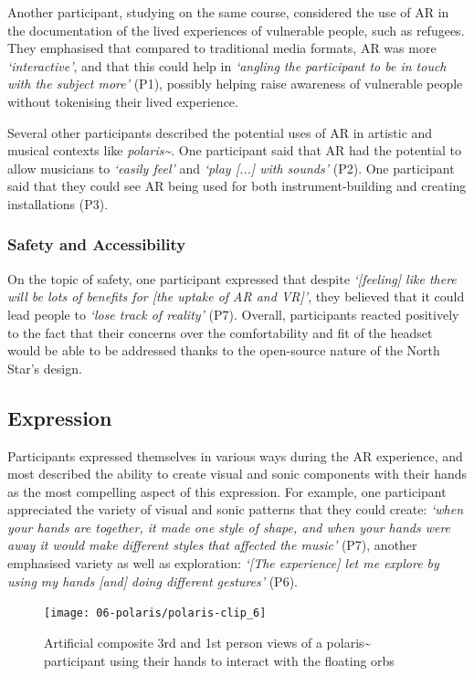 Another participant, studying on the same course, considered the use of AR in the documentation of the lived experiences of vulnerable people, such as refugees. They emphasised that compared to traditional media formats, AR was more \textit{`interactive'}, and that this could help in \textit{`angling the participant to be in touch with the subject more'} (P1), possibly helping raise awareness of vulnerable people without tokenising their lived experience.

Several other participants described the potential uses of AR in artistic and musical contexts like \textit{polaris\textasciitilde{}}. One participant said that AR had the potential to allow musicians to \textit{`easily feel'} and \textit{`play [...] with sounds'} (P2). One participant said that they could see AR being used for both instrument-building and creating installations (P3).

\subsubsection{Safety and Accessibility}\label{sec: polaris-feedback-adoption-safety}
On the topic of safety, one participant expressed that despite \textit{`[feeling] like there will be lots of benefits for [the uptake of AR and VR]'}, they believed that it could lead people to \textit{`lose track of reality'} (P7). Overall, participants reacted positively to the fact that their concerns over the comfortability and fit of the headset would be able to be addressed thanks to the open-source nature of the North Star's design.

\subsection{Expression}\label{sec: polaris-feedback-expression}
Participants expressed themselves in various ways during the AR experience, and most described the ability to create visual and sonic components with their hands as the most compelling aspect of this expression. For example, one participant appreciated the variety of visual and sonic patterns that they could create: \textit{`when your hands are together, it made one style of shape, and when your hands were away it would make different styles that affected the music'} (P7), another emphasised variety as well as exploration: \textit{`[The experience] let me explore by using my hands [and] doing different gestures'} (P6).

\begin{figure}[ht]
    \centering
    \texttt{[image: 06-polaris/polaris-clip\_6]}
    \captionsetup{justification=centering,margin=1.5cm}
    \caption{Artificial composite 3rd and 1st person views of a polaris\textasciitilde{} participant using their hands to interact with the floating orbs \citep[from][\href{https://youtu.be/T7CAjPk2Zs0}{clip URL}]{bilbow2022}}\label{fig: polaris-clip_6}
\end{figure}

